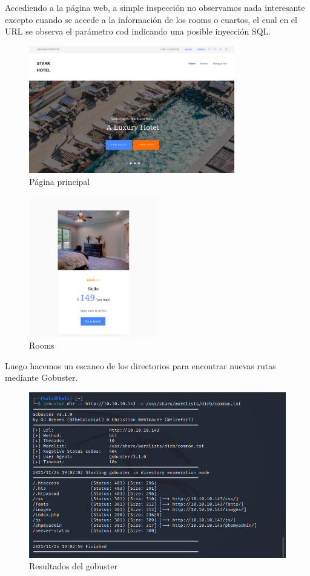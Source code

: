 \documentclass{article}
\begin{document}
Accediendo a la página web, a simple inspección no observamos nada interesante excepto cuando se accede a la información de los rooms o cuartos, el cual en el URL se observa el parámetro cod indicando una posible inyección SQL.
\begin{figure}[H]
	\center
	\includegraphics[width=0.8\textwidth]{images/jarvis/2.png}
	\caption{Página principal}
\end{figure}
\begin{figure}[H]
	\center
	\includegraphics[width=0.5\textwidth]{images/jarvis/3.png}
	\caption{Rooms}
\end{figure}

Luego hacemos un escaneo de los directorios para encontrar nuevas rutas mediante Gobuster.
\begin{figure}[H]
	\center
	\includegraphics[width=\textwidth]{images/jarvis/4.png}
	\caption{Resultados del gobuster}
\end{figure}
\end{document}
